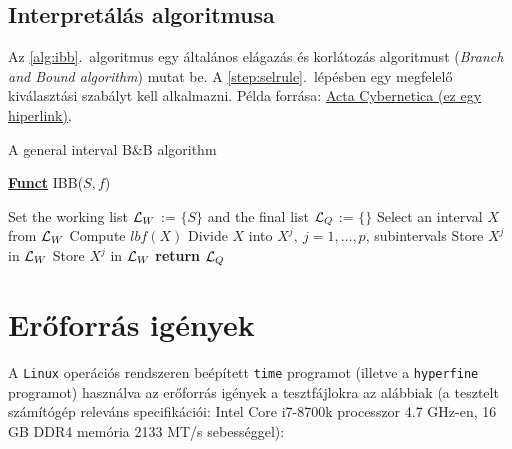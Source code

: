 \subsection{Interpretálás algoritmusa}

Az \ref{alg:ibb}.~algoritmus egy általános elágazás és korlátozás algoritmust (\emph{Branch and Bound algorithm}) mutat be. A \ref{step:selrule}.~lépésben egy megfelelő kiválasztási szabályt kell alkalmazni.
Példa forrása: \href{https://www.inf.u-szeged.hu/actacybernetica/}{Acta Cybernetica (ez egy hiperlink)}.

\begin{algorithm}[H]
\caption{A general interval B\&B algorithm}
\label{alg:ibb}
\textbf{\underline{Funct}} IBB($S,f$)
\begin{algorithmic}[1] %
\State Set the working list ${\cal L}_W$ := $\{S\}$ and the final list ${\cal L}_Q$ := $\{\}$
 \label{alg:igoend}
	\State Select an interval $X$ from ${\cal L}_W$ \label{step:selrule}
	\State Compute $lbf(X)$ 
	 
		\State Divide $X$ into $X^j,\ j=1,\dots, p$, subintervals   
			 
				\State Store $X^j$ in ${\cal L}_W$
			\Else
				\State Store $X^j$ in ${\cal L}_W$
			\EndIf
		\EndFor
	\EndIf
\EndWhile
\State \textbf{return} ${\cal L}_Q$
\end{algorithmic}
\end{algorithm}

\section{Erőforrás igények}

A \lstinline{Linux} operációs rendszeren beépített \lstinline{time} programot (illetve a \lstinline{hyperfine} programot) használva az erőforrás igények a tesztfájlokra az alábbiak (a tesztelt számítógép releváns specifikációi: Intel Core i7-8700k processzor 4.7 GHz-en, 16 GB DDR4 memória 2133 MT/s sebességgel):

